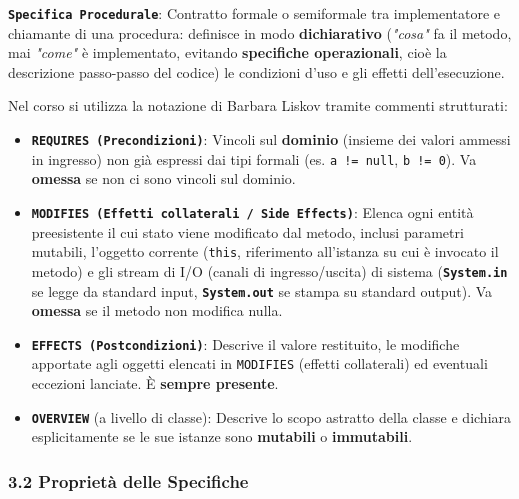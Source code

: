\textbf{\texttt{Specifica Procedurale}}: Contratto formale o semiformale tra implementatore e chiamante di una procedura: definisce in modo \textbf{dichiarativo} (\emph{"cosa"} fa il metodo, mai \emph{"come"} è implementato, evitando \textbf{specifiche operazionali}, cioè la descrizione passo-passo del codice) le condizioni d'uso e gli effetti dell'esecuzione.

Nel corso si utilizza la notazione di Barbara Liskov tramite commenti strutturati:

\begin{itemize}

\item \textbf{\texttt{REQUIRES (Precondizioni)}}: Vincoli sul \textbf{dominio} (insieme dei valori ammessi in ingresso) non già espressi dai tipi formali (es. \texttt{a != null}, \texttt{b != 0}). Va \textbf{omessa} se non ci sono vincoli sul dominio.



\item \textbf{\texttt{MODIFIES (Effetti collaterali / Side Effects)}}: Elenca ogni entità preesistente il cui stato viene modificato dal metodo, inclusi parametri mutabili, l'oggetto corrente (\texttt{this}, riferimento all'istanza su cui è invocato il metodo) e gli stream di I/O (canali di ingresso/uscita) di sistema (\textbf{\texttt{System.in}} se legge da standard input, \textbf{\texttt{System.out}} se stampa su standard output). Va \textbf{omessa} se il metodo non modifica nulla.



\item \textbf{\texttt{EFFECTS (Postcondizioni)}}: Descrive il valore restituito, le modifiche apportate agli oggetti elencati in \texttt{MODIFIES} (effetti collaterali) ed eventuali eccezioni lanciate. È \textbf{sempre presente}.



\item \textbf{\texttt{OVERVIEW}} (a livello di classe): Descrive lo scopo astratto della classe e dichiara esplicitamente se le sue istanze sono \textbf{mutabili} o \textbf{immutabili}.

\end{itemize}

\subsubsection{3.2 Proprietà delle Specifiche}\label{3-2-proprieta-delle-specifiche}


